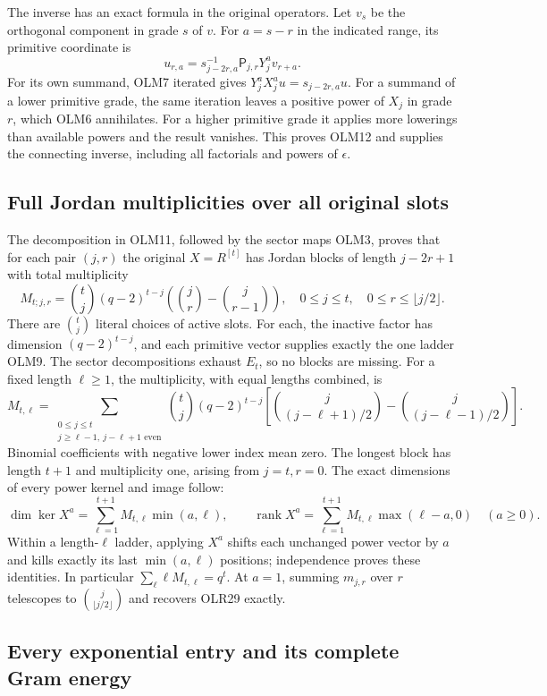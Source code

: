 The inverse has an exact formula in the original operators.
Let $v_s$ be the orthogonal component in grade $s$ of $v$.
For $a=s-r$ in the indicated range, its primitive coordinate is
\[
u_{r,a}=s_{j-2r,a}^{-1}\mathsf P_{j,r}Y_j^a v_{r+a}.
\tag{OLM12}
\]
For its own summand, OLM7 iterated gives
$Y_j^aX_j^a u=s_{j-2r,a}u$.
For a summand of a lower primitive grade, the same iteration
leaves a positive power of $X_j$ in grade $r$, which OLM6
annihilates. For a higher primitive grade it applies more
lowerings than available powers and the result vanishes.
This proves OLM12 and supplies the connecting inverse, including
all factorials and powers of $\epsilon$.

\subsection{Full Jordan multiplicities over all original slots}

The decomposition in OLM11, followed by the sector maps OLM3,
proves that for each pair $(j,r)$ the original $X=R^{[t]}$ has
Jordan blocks of length $j-2r+1$ with total multiplicity
\[
\boxed{
M_{t;j,r}=\binom tj(q-2)^{t-j}
       \left(\binom jr-\binom j{r-1}\right),
\quad0\le j\le t,\quad0\le r\le\lfloor j/2\rfloor.}
\tag{OLM13}
\]
There are $\binom tj$ literal choices of active slots.
For each, the inactive factor has dimension $(q-2)^{t-j}$,
and each primitive vector supplies exactly the one ladder OLM9.
The sector decompositions exhaust $E_t$, so no blocks are missing.
For a fixed length $\ell\ge1$, the multiplicity, with equal
lengths combined, is
\[
\boxed{
M_{t,\ell}=\sum_{\substack{0\le j\le t\\
j\ge\ell-1,\ j-\ell+1\text{ even}}}
\binom tj(q-2)^{t-j}
\left[
\binom j{(j-\ell+1)/2}-
\binom j{(j-\ell-1)/2}
\right].}
\tag{OLM14}
\]
Binomial coefficients with negative lower index mean zero.
The longest block has length $t+1$ and multiplicity one,
arising from $j=t,r=0$.
The exact dimensions of every power kernel and image follow:
\[
\dim\ker X^a=\sum_{\ell=1}^{t+1}M_{t,\ell}\min(a,\ell),
\qquad
\operatorname{rank}X^a
=\sum_{\ell=1}^{t+1}M_{t,\ell}\max(\ell-a,0)
\quad(a\ge0).
\tag{OLM15}
\]
Within a length-$\ell$ ladder, applying $X^a$ shifts each
unchanged power vector by $a$ and kills exactly its last
$\min(a,\ell)$ positions; independence proves these identities.
In particular $\sum_\ell\ell M_{t,\ell}=q^t$.
At $a=1$, summing $m_{j,r}$ over $r$ telescopes to
$\binom j{\lfloor j/2\rfloor}$ and recovers OLR29 exactly.

\subsection{Every exponential entry and its complete Gram energy}

